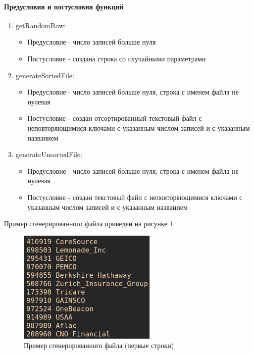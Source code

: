 \documentclass[a4paper, 14pt]{extarticle}
\begin{document}
\paragraph{Предусловия и постусловия функций}
\begin{enumerate}
  \item getRandomRow:
    \begin{itemize}
      \item Предусловие - число записей больше нуля
      \item Постусловие - создана строка со случайными параметрами
    \end{itemize}
  \item generateSortedFile:
    \begin{itemize}
      \item Предусловие - число записей больше нуля, строка с именем файла не нулевая
      \item Постусловие - создан отсортированный текстовый файл с
        неповторяющимися ключами с указанным числом записей и с указанным названием
    \end{itemize}
  \item generateUnsortedFile:
    \begin{itemize}
      \item Предусловие - число записей больше нуля, строка с именем файла не нулевая
      \item Постусловие - создан текстовый файл с
        неповторяющимися ключами с указанным числом записей и с указанным названием
    \end{itemize}
\end{enumerate}
Пример сгенерированного файла приведен на рисунке \ref{fig:search_data}.
\begin{figure}[htpb]
  \centering
  \includegraphics[width=0.6\textwidth]{pictures/gen_file.png}
  \caption{Пример сгенерированного файла (первые строки)}
  \label{fig:search_data}
\end{figure}
\end{document}
